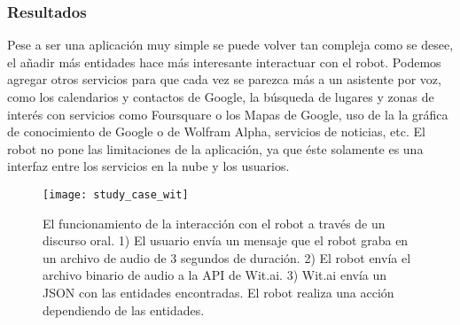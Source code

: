 
\subsubsection{Resultados}

Pese a ser una aplicación muy simple
se puede volver tan compleja como se desee,
el añadir más entidades hace más interesante interactuar con el
robot. Podemos agregar otros servicios para
que cada vez se parezca más a un asistente por voz,
como los calendarios y contactos de Google, la búsqueda de lugares y
zonas de interés con servicios como Foursquare o los Mapas de Google,
uso de la la gráfica de conocimiento de Google o de Wolfram Alpha, 
servicios de noticias, etc. El robot no pone las limitaciones 
de la aplicación, ya que éste solamente es una interfaz
entre los servicios en la nube y los usuarios.

\begin{figure}[htbp]
\centering
\caption{El funcionamiento de la interacción con el robot a través de un discurso
oral. 1) El usuario envía un mensaje que el robot graba en un archivo de audio de 3 segundos de duración. 2) El robot envía el archivo binario de audio
a la API de Wit.ai. 3) Wit.ai envía un JSON con las entidades encontradas. El robot realiza una acción dependiendo de las entidades.}
\texttt{[image: study\_case\_wit]}
\end{figure}


